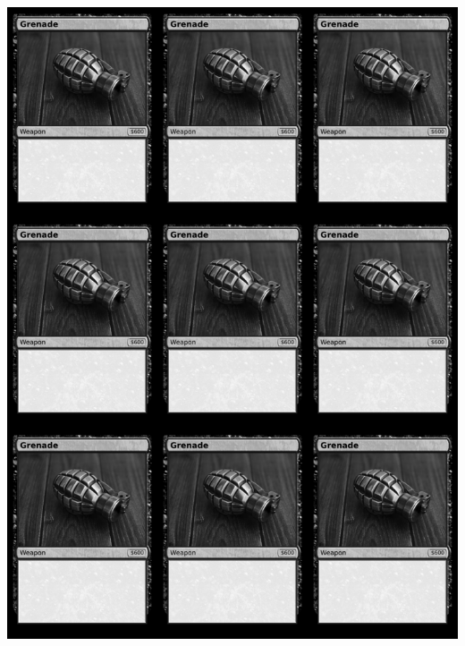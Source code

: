 \documentclass[a4paper]{article}
\begin{document}
\begin{center}
	\centering
	\includegraphics[width=190.5mm,height=266.7mm]{output/temp/page8.png}
\end{center}

\newpage
\end{document}
